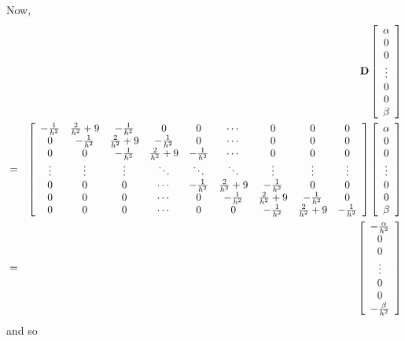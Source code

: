 \begin{solution}
\begin{enumerate}
\[\]
Now,
\begin{eqnarray*}
&&{\bf D}\left[\begin{array}{c} \alpha \\ 0 \\ 0 \\ \vdots \\ 0 \\ 0 \\ \beta \end{array}\right]
\\
&=&\left[\begin{array}{ccccccccc} 
-\frac{1}{h^2} & \frac{2}{h^2}+9 & -\frac{1}{h^2} & 0 & 0 & \cdots & 0 & 0 & 0
\\
0 & -\frac{1}{h^2} & \frac{2}{h^2}+9 & -\frac{1}{h^2} & 0 & \cdots & 0 & 0 & 0
\\
0 & 0 & -\frac{1}{h^2} & \frac{2}{h^2}+9 & -\frac{1}{h^2} & \cdots & 0 & 0 & 0
\\
\vdots & \vdots & \vdots & \ddots & \ddots & \ddots & \vdots & \vdots & \vdots
\\
0 & 0 & 0 & \cdots & -\frac{1}{h^2} & \frac{2}{h^2}+9 & -\frac{1}{h^2} & 0 & 0
\\
0 & 0  & 0 & \cdots & 0 & -\frac{1}{h^2} & \frac{2}{h^2}+9 & -\frac{1}{h^2} & 0
\\
0 & 0 & 0 & \cdots & 0 & 0 & -\frac{1}{h^2} & \frac{2}{h^2}+9 & -\frac{1}{h^2}
 \end{array}\right]\left[\begin{array}{c} \alpha \\ 0 \\ 0 \\ \vdots \\ 0 \\ 0 \\ \beta \end{array}\right]
\\
&=&\left[\begin{array}{c} -\frac{\alpha}{h^2} \\ 0 \\ 0 \\ \vdots \\ 0 \\ 0 \\ -\frac{\beta}{h^2} \end{array}\right]
\end{eqnarray*}
and so
\[
\]
\end{enumerate}
\end{solution}
